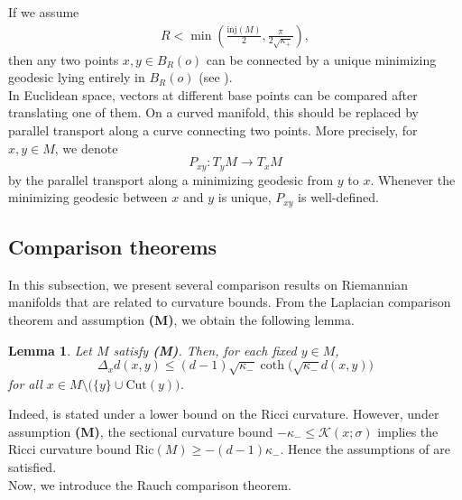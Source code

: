 \documentclass[11pt]{amsart}
\newtheorem{lemma}{Lemma}[section]
\newcommand{\dm}{d} %
\newcommand{\p}{o}%
\newcommand{\dist}{d}%
\begin{document}
If we assume 
\begin{align*}\label{condR}
R<\min\left(\frac{\mathrm{inj}(M)}{2}, \frac{\pi}{2\sqrt{\kappa_+}}\right),
\end{align*}
then any two points $x,y\in B_R(\p)$ can be connected by a unique minimizing geodesic lying entirely in $B_R(\p)$ (see  \cite[Theorem 6.4.8]{Petersen2016}).\\

In Euclidean space, vectors at different base points can be compared after translating one of them. On a curved manifold, this should be replaced by parallel transport along a curve connecting two points. More precisely, for $x,y\in M$, we denote  
\[
P_{xy}:T_yM\to T_xM
\]
by the parallel transport along a minimizing geodesic from $y$ to $x$. Whenever the minimizing geodesic between $x$ and $y$ is unique, $P_{xy}$ is well-defined.

\subsection{Comparison theorems}

In this subsection, we present several comparison results on Riemannian manifolds that are related to curvature bounds. From the Laplacian comparison theorem \cite[Lemma 7.1.9]{Petersen2016} and assumption \textbf{(M)}, we obtain the following lemma.
 
\begin{lemma} \label{lem:laplace}
Let $M$ satisfy \textbf{(M)}. Then, for each fixed $y\in M$,
\[
\Delta_x \dist(x,y)
\leq
(\dm-1)\sqrt{\kappa_-}\coth\bigl(\sqrt{\kappa_-}\dist(x,y)\bigr)
\]
for all $x\in M\setminus\bigl(\{y\}\cup \mathrm{Cut}(y)\bigr)$.
\end{lemma}

Indeed, \cite[Lemma 7.1.9]{Petersen2016} is stated under a lower bound on the Ricci curvature. However, under assumption \textbf{(M)}, the sectional curvature bound $-\kappa_- \leq \mathcal{K}(x;\sigma)$ implies the Ricci curvature bound $\mathrm{Ric}(M)\geq-(\dm-1)\kappa_-$. Hence the assumptions of \cite[Lemma 7.1.9]{Petersen2016} are satisfied.\\


Now, we introduce the Rauch comparison theorem.
\end{document}
